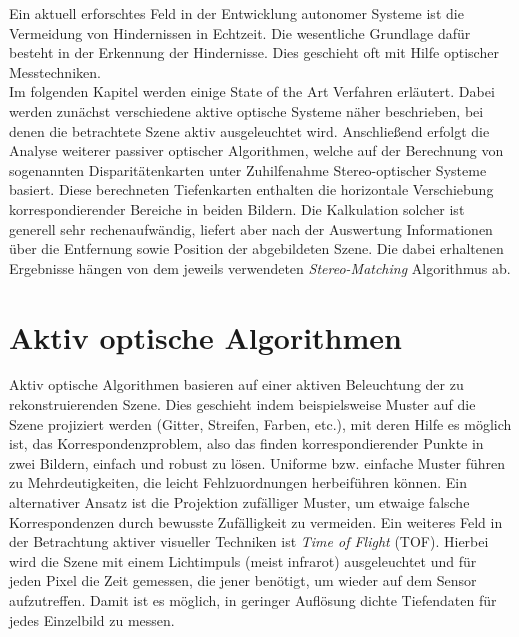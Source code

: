 Ein aktuell erforschtes Feld in der Entwicklung autonomer Systeme ist die Vermeidung von Hindernissen in Echtzeit. Die wesentliche Grundlage dafür besteht in der Erkennung der Hindernisse. Dies geschieht oft mit Hilfe optischer Messtechniken.\\

\noindent
Im folgenden Kapitel werden einige State of the Art Verfahren erläutert. Dabei werden zunächst verschiedene aktive optische Systeme näher beschrieben, bei denen die betrachtete Szene aktiv ausgeleuchtet wird. Anschließend erfolgt die Analyse weiterer passiver optischer Algorithmen, welche auf der Berechnung von sogenannten Disparitätenkarten unter Zuhilfenahme Stereo-optischer Systeme basiert. Diese berechneten Tiefenkarten enthalten die horizontale Verschiebung korrespondierender Bereiche in beiden Bildern. Die Kalkulation solcher ist generell sehr rechenaufwändig, liefert aber nach der Auswertung Informationen über die Entfernung sowie Position der abgebildeten Szene. Die dabei erhaltenen Ergebnisse hängen von dem jeweils verwendeten \emph{Stereo-Matching} Algorithmus ab.

\section{Aktiv optische Algorithmen}
\label{sec:kamera_basierte_he}
Aktiv optische Algorithmen basieren auf einer aktiven Beleuchtung der zu rekonstruierenden Szene. Dies geschieht indem beispielsweise Muster auf die Szene projiziert werden (Gitter, Streifen, Farben, etc.), mit deren Hilfe es möglich ist, das Korrespondenzproblem, also das finden korrespondierender Punkte in zwei Bildern, einfach und robust zu lösen. Uniforme bzw. einfache Muster führen zu Mehrdeutigkeiten, die leicht Fehlzuordnungen herbeiführen können. Ein alternativer Ansatz ist die Projektion zufälliger Muster, um etwaige falsche Korrespondenzen durch bewusste Zufälligkeit zu vermeiden. Ein weiteres Feld in der Betrachtung aktiver visueller Techniken ist \emph{Time of Flight} (TOF). Hierbei wird die Szene mit einem Lichtimpuls (meist infrarot) ausgeleuchtet und für jeden Pixel die Zeit gemessen, die jener benötigt, um wieder auf dem Sensor aufzutreffen. Damit ist es möglich, in geringer Auflösung dichte Tiefendaten für jedes Einzelbild zu messen.\\

